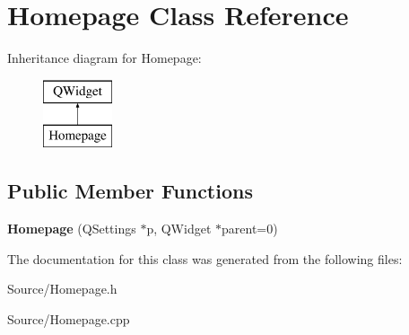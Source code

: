 \hypertarget{class_homepage}{}\section{Homepage Class Reference}
\label{class_homepage}
Inheritance diagram for Homepage\+:\begin{figure}[H]
\begin{center}
\leavevmode
\includegraphics[height=2.000000cm]{class_homepage}
\end{center}
\end{figure}
\subsection*{Public Member Functions}
\begin{DoxyCompactItemize}
\item 
\hypertarget{class_homepage_a49e7e34d9c90f9e647d99003a105f7e4}{}{\bfseries Homepage} (Q\+Settings $\ast$p, Q\+Widget $\ast$parent=0)\label{class_homepage_a49e7e34d9c90f9e647d99003a105f7e4}

\end{DoxyCompactItemize}


The documentation for this class was generated from the following files\+:\begin{DoxyCompactItemize}
\item 
Source/Homepage.\+h\item 
Source/Homepage.\+cpp\end{DoxyCompactItemize}
